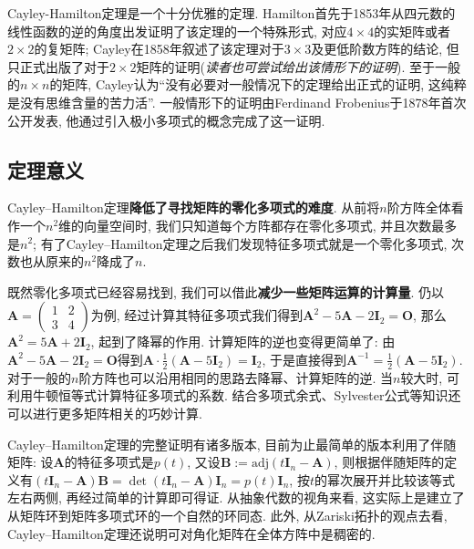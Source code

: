 \documentclass[main]{subfiles}
\newcommand{\dis}{\displaystyle}
\newcommand{\adj}{\mathrm{adj}}
\begin{document}
Cayley-Hamilton定理是一个十分优雅的定理. Hamilton首先于1853年从四元数的线性函数的逆的角度出发证明了该定理的一个特殊形式, 对应$4\times 4$的实矩阵或者$2\times 2$的复矩阵; Cayley在1858年叙述了该定理对于$3\times 3$及更低阶数方阵的结论, 但只正式出版了对于$2\times 2$矩阵的证明(\textit{读者也可尝试给出该情形下的证明}). 至于一般的$n\times n$的矩阵, Cayley认为“没有必要对一般情况下的定理给出正式的证明, 这纯粹是没有思维含量的苦力活”. 一般情形下的证明由Ferdinand Frobenius于1878年首次公开发表, 他通过引入极小多项式的概念完成了这一证明.

\subsection{定理意义}
Cayley–Hamilton定理\textbf{降低了寻找矩阵的零化多项式的难度}. 从前将$n$阶方阵全体看作一个$n^{2}$维的向量空间时, 我们只知道每个方阵都存在零化多项式, 并且次数最多是$n^2$; 有了Cayley–Hamilton定理之后我们发现特征多项式就是一个零化多项式, 次数也从原来的$n^2$降成了$n$.

既然零化多项式已经容易找到, 我们可以借此\textbf{减少一些矩阵运算的计算量}. 仍以$\boldsymbol{A}=\begin{pmatrix}
		1 & 2 \\
		3 & 4
	\end{pmatrix}$为例, 经过计算其特征多项式我们得到$\boldsymbol{A}^2-5\boldsymbol{A}-2\boldsymbol{I}_2=\boldsymbol{O}$, 那么$\boldsymbol{A}^2=5\boldsymbol{A}+2\boldsymbol{I}_2$, 起到了降幂的作用. 计算矩阵的逆也变得更简单了: 由$\boldsymbol{A}^2-5\boldsymbol{A}-2\boldsymbol{I}_2=\boldsymbol{O}$得到$\dis\boldsymbol{A}\cdot\frac{1}{2}(\boldsymbol{A}-5\boldsymbol{I}_2)=\boldsymbol{I}_2$, 于是直接得到$\dis\boldsymbol{A}^{-1}=\frac{1}{2}(\boldsymbol{A}-5\boldsymbol{I}_2)$. 对于一般的$n$阶方阵也可以沿用相同的思路去降幂、计算矩阵的逆. 当$n$较大时, 可利用牛顿恒等式计算特征多项式的系数. 结合多项式余式、Sylvester公式等知识还可以进行更多矩阵相关的巧妙计算.

Cayley–Hamilton定理的完整证明有诸多版本, 目前为止最简单的版本利用了伴随矩阵: 设$\boldsymbol{A}$的特征多项式是$p(t)$, 又设$\boldsymbol{B}:=\adj(t\boldsymbol{I}_n-\boldsymbol{A})$, 则根据伴随矩阵的定义有$(t\boldsymbol{I}_n-\boldsymbol{A})\boldsymbol{B}=\det(t\boldsymbol{I}_n-\boldsymbol{A})\boldsymbol{I}_n=p(t)\boldsymbol{I}_n$, 按$t$的幂次展开并比较该等式左右两侧, 再经过简单的计算即可得证. 从抽象代数的视角来看, 这实际上是建立了从矩阵环到矩阵多项式环的一个自然的环同态. 此外, 从Zariski拓扑的观点去看, Cayley–Hamilton定理还说明可对角化矩阵在全体方阵中是稠密的.
\end{document}
